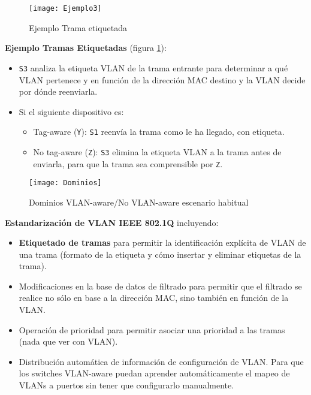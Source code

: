 \documentclass[10pt,portrait, twocolumn]{article}
\begin{document}
\begin{figure}[!ht]	
	\centering
    	\texttt{[image: Ejemplo3]}
	\caption{Ejemplo Trama etiquetada}
	\label{fig:E3}
\end{figure} 
	
\textbf{Ejemplo Tramas Etiquetadas} (figura \ref{fig:E3}): 

	\begin{itemize}
	\item \texttt{S3} analiza la etiqueta VLAN de la trama entrante para determinar a qué VLAN pertenece y en función de la dirección MAC destino y la VLAN decide por dónde reenviarla.
	\item Si el siguiente dispositivo es:
		\begin{itemize}
		\item Tag-aware (\texttt{Y}): \texttt{S1} reenvía la trama como le ha llegado, con etiqueta.
		\item No tag-aware (\texttt{Z}): \texttt{S3} elimina la etiqueta VLAN a la trama antes de enviarla, para que la trama sea comprensible por \texttt{Z}.
		\end{itemize}
	\end{itemize}
	
\begin{figure}[!ht]	
	\centering
    	\texttt{[image: Dominios]}
	\caption{Dominios VLAN-aware/No VLAN-aware escenario habitual}
\end{figure} 

\textbf{Estandarización de VLAN IEEE 802.1Q} incluyendo:

	\begin{itemize}
	\item \textbf{Etiquetado de tramas} para permitir la identificación explícita de VLAN de una trama (formato de la etiqueta y cómo insertar y eliminar etiquetas de la trama).
	\item Modificaciones en la base de datos de filtrado para permitir que el filtrado se realice no sólo en base a la dirección MAC, sino también en función de la VLAN.
	\item Operación de prioridad para permitir asociar una prioridad a las tramas (nada que ver con VLAN).
	\item Distribución automática de información de configuración de VLAN. Para que los switches VLAN-aware puedan aprender automáticamente el mapeo de VLANs a puertos sin tener que configurarlo manualmente.
	\end{itemize}
\end{document}
